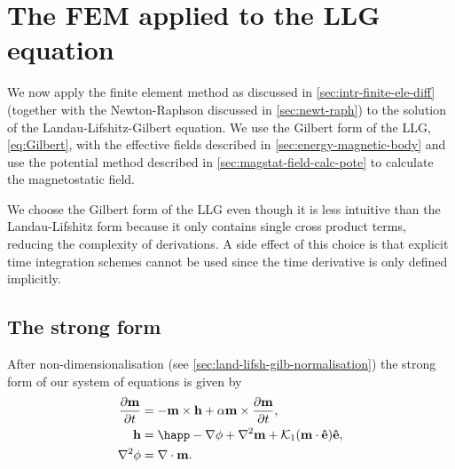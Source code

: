 {\section{The FEM applied to the LLG equation}
\label{sec:llg-initial-equations}

We now apply the finite element method as discussed in \cref{sec:intr-finite-ele-diff} (together with the Newton-Raphson discussed in \cref{sec:newt-raph}) to the solution of the Landau-Lifshitz-Gilbert equation.
We use the Gilbert form of the LLG, \cref{eq:Gilbert}, with the effective fields described in \cref{sec:energy-magnetic-body} and use the potential method described in \cref{sec:magstat-field-calc-pote} to calculate the magnetostatic field.

We choose the Gilbert form of the LLG even though it is less intuitive than the Landau-Lifshitz form because it only contains single cross product terms, reducing the complexity of derivations.
A side effect of this choice is that explicit time integration schemes cannot be used since the time derivative is only defined implicitly.

\subsection{The strong form}

After non-dimensionalisation (see \cref{sec:land-lifsh-gilb-normalisation}) the strong form of our system of equations is given by
\begin{equation}
  \begin{aligned}
    \dmdt &= - \mv \times \hv + \alpha \mv \times \dmdt, \\
    \hv &= \happ - \grad \phim + \lap \mv + \kone (\mv \cdot \ev) \ev, \\
    \lap \phim &= \div \mv.
    \label{eqn:ndllg-starting}
  \end{aligned}
\end{equation}

}
